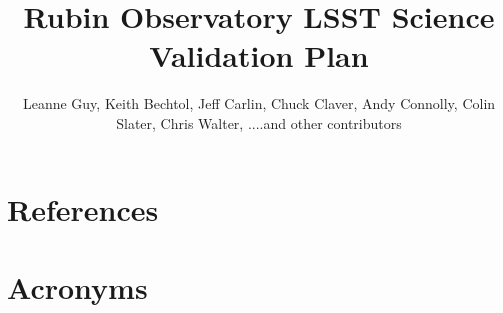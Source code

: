 \documentclass[DM,lsstdraft,toc]{lsstdoc}
\title{Rubin Observatory LSST Science Validation Plan}
\author{%
Leanne Guy, Keith Bechtol, Jeff Carlin, Chuck Claver, Andy Connolly, Colin Slater, Chris Walter, ....and other contributors
}
\date{\vcsDate}
\begin{document}
\maketitle





\appendix
\section{References} \label{sec:bib}
\renewcommand{\refname}{} %


\section{Acronyms} \label{sec:acronyms}

\end{document}
